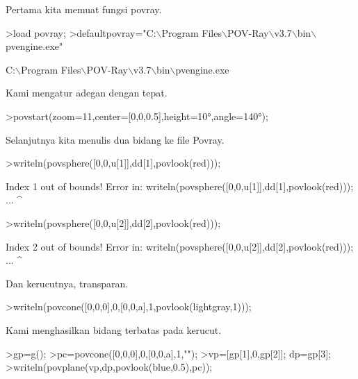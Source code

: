\documentclass[a4paper,10pt]{article}
\begin{document}
\begin{eulernotebook}
\begin{eulercomment}
\begin{eulercomment}
\begin{eulercomment}
\begin{eulercomment}
\begin{eulercomment}
\begin{eulercomment}
\begin{eulercomment}
\begin{eulercomment}
\begin{eulercomment}
\begin{eulercomment}
\begin{eulercomment}
\begin{eulercomment}
\begin{eulercomment}
\begin{eulercomment}
\begin{eulercomment}
\begin{eulercomment}
\begin{eulercomment}
Pertama kita memuat fungsi povray.
\end{eulercomment}
\begin{eulerprompt}
>load povray;
>defaultpovray="C:\(\backslash\)Program Files\(\backslash\)POV-Ray\(\backslash\)v3.7\(\backslash\)bin\(\backslash\)pvengine.exe"
\end{eulerprompt}
\begin{euleroutput}
  C:\(\backslash\)Program Files\(\backslash\)POV-Ray\(\backslash\)v3.7\(\backslash\)bin\(\backslash\)pvengine.exe
\end{euleroutput}
\begin{eulercomment}
Kami mengatur adegan dengan tepat.
\end{eulercomment}
\begin{eulerprompt}
>povstart(zoom=11,center=[0,0,0.5],height=10°,angle=140°);
\end{eulerprompt}
\begin{eulercomment}
Selanjutnya kita menulis dua bidang ke file Povray.
\end{eulercomment}
\begin{eulerprompt}
>writeln(povsphere([0,0,u[1]],dd[1],povlook(red)));
\end{eulerprompt}
\begin{euleroutput}
  Index 1 out of bounds!
  Error in:
  writeln(povsphere([0,0,u[1]],dd[1],povlook(red))); ...
                             ^
\end{euleroutput}
\begin{eulerprompt}
>writeln(povsphere([0,0,u[2]],dd[2],povlook(red)));
\end{eulerprompt}
\begin{euleroutput}
  Index 2 out of bounds!
  Error in:
  writeln(povsphere([0,0,u[2]],dd[2],povlook(red))); ...
                             ^
\end{euleroutput}
\begin{eulercomment}
Dan kerucutnya, transparan.
\end{eulercomment}
\begin{eulerprompt}
>writeln(povcone([0,0,0],0,[0,0,a],1,povlook(lightgray,1)));
\end{eulerprompt}
\begin{eulercomment}
Kami menghasilkan bidang terbatas pada kerucut.
\end{eulercomment}
\begin{eulerprompt}
>gp=g();
>pc=povcone([0,0,0],0,[0,0,a],1,"");
>vp=[gp[1],0,gp[2]]; dp=gp[3];
>writeln(povplane(vp,dp,povlook(blue,0.5),pc));
\end{eulerprompt}

\end{eulercomment}
\end{eulercomment}
\end{eulercomment}
\end{eulercomment}
\end{eulercomment}
\end{eulercomment}
\end{eulercomment}
\end{eulercomment}
\end{eulercomment}
\end{eulercomment}
\end{eulercomment}
\end{eulercomment}
\end{eulercomment}
\end{eulercomment}
\end{eulercomment}
\end{eulercomment}
\end{eulernotebook}
\end{document}
